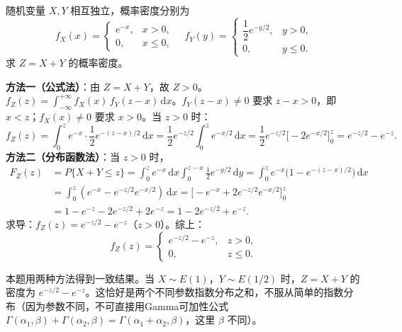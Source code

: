 \documentclass[lang=cn,11pt]{elegantbook}
\begin{document}
\begin{exercise} \label{exer:3-12c}
随机变量 $X, Y$ 相互独立，概率密度分别为
\[
f_X(x) = \begin{cases} e^{-x}, & x > 0, \\ 0, & x \leqslant 0, \end{cases} \quad f_Y(y) = \begin{cases} \dfrac{1}{2}e^{-y/2}, & y > 0, \\ 0, & y \leqslant 0. \end{cases}
\]
求 $Z = X + Y$ 的概率密度。
\end{exercise}
\begin{solution}
\textbf{方法一（公式法）}：由 $Z = X+Y$，故 $Z > 0$。$f_Z(z) = \displaystyle\int_{-\infty}^{+\infty}f_X(x)\,f_Y(z-x)\,\mathrm{d}x$。$f_Y(z-x) \neq 0$ 要求 $z-x > 0$，即 $x < z$；$f_X(x) \neq 0$ 要求 $x > 0$。当 $z > 0$ 时：
\[
f_Z(z) = \int_0^z e^{-x} \cdot \frac{1}{2}e^{-(z-x)/2}\,\mathrm{d}x = \frac{1}{2}e^{-z/2}\int_0^z e^{-x/2}\,\mathrm{d}x = \frac{1}{2}e^{-z/2}\bigl[-2e^{-x/2}\bigr]_0^z = e^{-z/2} - e^{-z}.
\]
\textbf{方法二（分布函数法）}：当 $z > 0$ 时，
\begin{align*}
F_Z(z)& = P\{X+Y \leqslant z\} = \int_0^z e^{-x}\,\mathrm{d}x\int_0^{z-x}\frac{1}{2}e^{-y/2}\,\mathrm{d}y = \int_0^z e^{-x}\bigl(1-e^{-(z-x)/2}\bigr)\,\mathrm{d}x\\
&= \int_0^z(e^{-x} - e^{-z/2}e^{-x/2})\,\mathrm{d}x = \bigl[-e^{-x} + 2e^{-z/2}e^{-x/2}\bigr]_0^z \\
&= 1 - e^{-z} - 2e^{-z/2} + 2e^{-z} = 1 - 2e^{-z/2} + e^{-z}.
\end{align*}
求导：$f_Z(z) = e^{-z/2} - e^{-z}$（$z > 0$）。综上：
\[
f_Z(z) = \begin{cases} e^{-z/2} - e^{-z}, & z > 0, \\ 0, & z \leqslant 0. \end{cases}
\]
\begin{note}
本题用两种方法得到一致结果。当 $X \sim E(1)$，$Y \sim E(1/2)$ 时，$Z = X+Y$ 的密度为 $e^{-z/2} - e^{-z}$。这恰好是两个不同参数指数分布之和，不服从简单的指数分布（因为参数不同，不可直接用Gamma可加性公式 $\Gamma(\alpha_1,\beta) + \Gamma(\alpha_2,\beta) = \Gamma(\alpha_1+\alpha_2,\beta)$，这里 $\beta$ 不同）。
\end{note}
\end{solution}
\end{document}
